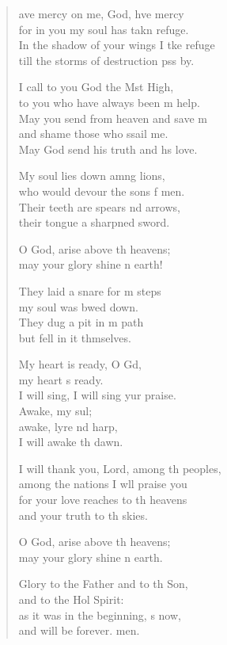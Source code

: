 \begin{verse}
  \begin{patverse}
    ave mercy on me, God, hve mercy\Med\\
for in you my soul has takn refuge.\\
In the shadow of your wings I tke refuge\Med\\
till the storms of destruction pss by.

I call to you God the Mst High,\Med\\
to you who have always been m help.\\
May you send from heaven and save m\Flex\\
and shame those who ssail me.\Med\\
May God send his truth and h\pointup{\i}s love.

My soul lies down amng lions,\Med\\
who would devour the sons f men.\\
Their teeth are spears nd arrows,\Med\\
their tongue a sharpned sword.

O God, arise above th heavens;\Med\\
may your glory shine n earth!

They laid a snare for m steps\Med\\
my soul was bwed down.\\
They dug a pit in m path\Med\\
but fell in it thmselves.

My heart is ready, O Gd,\Flex\\
my heart \pointup{\i}s ready.\Med\\
I will sing, I will sing yur praise.\\
Awake, my sul;\Flex\\
awake, lyre nd harp,\Med\\
I will awake th dawn.

I will thank you, Lord, among th peoples,\Med\\
among the nations I w\pointup{\i}ll praise you\\
for your love reaches to th heavens\Med\\
and your truth to th skies.

O God, arise above th heavens;\Med\\
may your glory shine n earth.

Glory to the Father and to th Son,\Med\\
and to the Hol Spirit:\\
as it was in the beginning, \pointup{\i}s now,\Med\\
and will be forever. men. 
  \end{patverse}
\end{verse}
